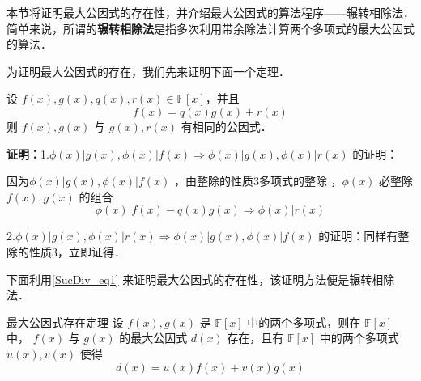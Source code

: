 
本节将证明最大公因式的存在性，并介绍最大公因式的算法程序——辗转相除法．简单来说，所谓的\textbf{辗转相除法}是指多次利用带余除法计算两个多项式的最大公因式的算法．

为证明最大公因式的存在，我们先来证明下面一个定理．
\begin{theorem}{}
设 $f(x),g(x),q(x),r(x)\in\mathbb{F}[x]$，并且
\begin{equation}\label{SucDiv_eq1}
f(x)=q(x)g(x)+r(x)
\end{equation}
则 $f(x),g(x)$ 与 $g(x),r(x)$ 有相同的公因式．
\end{theorem}
\textbf{证明：}1.$\phi(x)|g(x),\phi(x)|f(x)\Rightarrow \phi(x)|g(x),\phi(x)|r(x)$ 的证明：

因为$\phi(x)|g(x),\phi(x)|f(x)$ ，由整除的性质3多项式的整除 ，$\phi(x)$ 必整除 $f(x),g(x)$ 的组合
\begin{equation}
\phi(x)|f(x)-q(x)g(x)\Rightarrow \phi(x)|r(x)
\end{equation}

2.$\phi(x)|g(x),\phi(x)|r(x)\Rightarrow\phi(x)|g(x),\phi(x)|f(x)$ 的证明：同样有整除的性质3，立即证得．

下面利用\autoref{SucDiv_eq1} 来证明最大公因式的存在性，该证明方法便是辗转相除法．
\begin{theorem}{最大公因式存在定理}
设 $f(x),g(x)$ 是 $\mathbb{F}[x]$ 中的两个多项式，则在 $\mathbb{F}[x]$ 中， $f(x)$ 与 $g(x)$ 的最大公因式 $d(x)$ 存在，且有 $\mathbb{F}[x]$ 中的两个多项式 $u(x),v(x)$ 使得
\begin{equation}
d(x)=u(x)f(x)+v(x)g(x)
\end{equation}

\end{theorem}